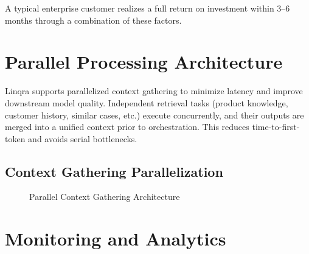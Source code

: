 \documentclass[11pt,a4paper]{article}
\begin{document}
A typical enterprise customer realizes a full return on investment within 3--6 months through a combination of these factors.

\newpage

\section{Parallel Processing Architecture}

Linqra supports parallelized context gathering to minimize latency and improve downstream model quality. Independent retrieval tasks (product knowledge, customer history, similar cases, etc.) execute concurrently, and their outputs are merged into a unified context prior to orchestration. This reduces time-to-first-token and avoids serial bottlenecks.

\subsection{Context Gathering Parallelization}

\begin{figure}[H]
\centering
{}
\caption{Parallel Context Gathering Architecture}
\end{figure}

\newpage
\section{Monitoring and Analytics}
\end{document}
